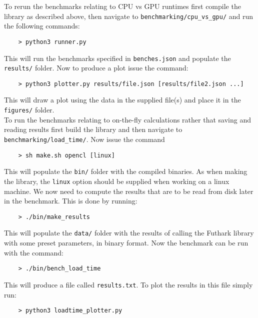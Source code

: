 \begin{appendices}
    To rerun the benchmarks relating to CPU vs GPU runtimes first compile the library as described above, then navigate to \texttt{benchmarking/cpu\_vs\_gpu/} and run the following commands:
    \begin{simplebox}
        \begin{verbatim}
    > python3 runner.py
        \end{verbatim} 
    \end{simplebox}
    This will run the benchmarks specified in \texttt{benches.json} and populate the \texttt{results/} folder.
    Now to produce a plot issue the command:
    \begin{simplebox}
        \begin{verbatim}
    > python3 plotter.py results/file.json [results/file2.json ...]
        \end{verbatim} 
    \end{simplebox}
    This will draw a plot using the data in the supplied file(s) and place it in the \texttt{figures/} folder.\\

    To run the benchmarks relating to on-the-fly calculations rather that saving and reading results first build the library and then navigate to \texttt{benchmarking/load\_time/}. Now issue the command
    \begin{simplebox}
        \begin{verbatim}
    > sh make.sh opencl [linux]
        \end{verbatim} 
    \end{simplebox}
    This will populate the \texttt{bin/} folder with the compiled binaries. As when making the library, the \texttt{linux} option should be supplied when working on a linux machine. We now need to compute the results that are to be read from disk later in the benchmark. This is done by running:
    \begin{simplebox}
        \begin{verbatim}
    > ./bin/make_results
        \end{verbatim} 
    \end{simplebox}
    This will populate the \texttt{data/} folder with the results of calling the Futhark library with some preset parameters, in binary format. Now the benchmark can be run with the command:
    \begin{simplebox}
        \begin{verbatim}
    > ./bin/bench_load_time
        \end{verbatim} 
    \end{simplebox}
    This will produce a file called \texttt{results.txt}. To plot the results in this file simply run:
    \begin{simplebox}
        \begin{verbatim}
    > python3 loadtime_plotter.py
        \end{verbatim} 
    \end{simplebox} 


\end{appendices}
